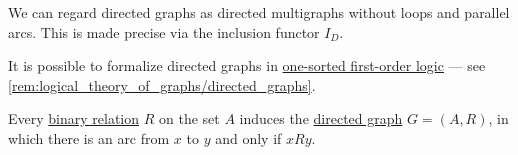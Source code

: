 \begin{comments}
  \item We can regard directed graphs as directed multigraphs without loops and parallel arcs. This is made precise via the inclusion functor \hyperref[def:graph_functors/directed_inclusion]{\( I_D \)}.

  \item It is possible to formalize directed graphs in \hyperref[def:first_order_logic]{one-sorted first-order logic} --- see \cref{rem:logical_theory_of_graphs/directed_graphs}.
\end{comments}

\begin{definition}\label{def:directed_graph_induced_by_relation}
  Every \hyperref[def:binary_relation]{binary relation} \( R \) on the set \( A \) induces the \hyperref[def:directed_graph]{directed graph} \( G = (A, R) \), in which there is an arc from \( x \) to \( y \) and only if \( x R y \).
\end{definition}

